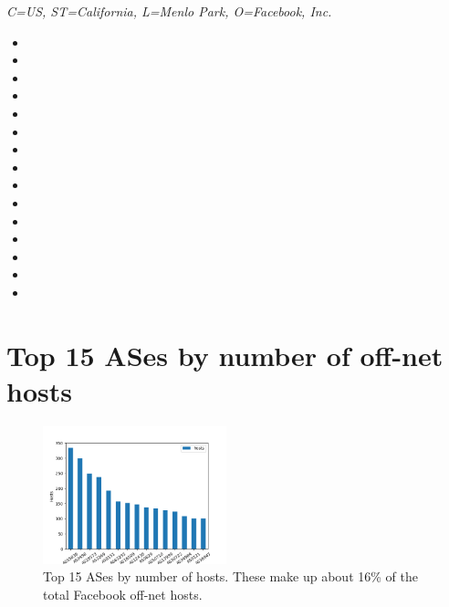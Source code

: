 \documentclass[sigconf,10pt,nonacm]{acmart}
\begin{document}
\textit{C=US, ST=California, L=Menlo Park, O=Facebook, Inc.}

\begin{itemize}
    \item {}
    \item {}
    \item {}
    \item {}
    \item {}
    \item {}
    \item {}
    \item {}
    \item {}
    \item {}
    \item {}
    \item {}
    \item {}
    \item {}
    \item {}
\end{itemize}

\section{Top 15 ASes by number of off-net hosts}
\begin{figure}[h]
    \centering
    \includegraphics[width=0.475\textwidth]{graphics/hosts_per_AS_min_100.png}
    \caption[Top 15 ASes by number of hosts]{Top 15 ASes by number of hosts. These make up about 16\% of the total Facebook off-net hosts.}
    \label{fig:hosts_per_as_top_15}
\end{figure}
\end{document}
